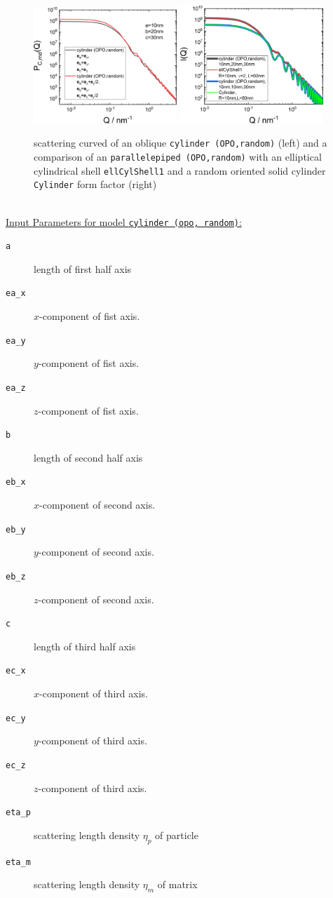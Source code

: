 \begin{figure}[htb]
\includegraphics[width=0.481\textwidth]{../images/form_factor/oriented_primitive_opbjects/cylinderOPOoblique.png} \hfill
\includegraphics[width=0.481\textwidth]{../images/form_factor/oriented_primitive_opbjects/cylinderOPOcompare.png}
\caption{scattering curved of an oblique \texttt{cylinder (OPO,random)} (left) and a comparison of an \texttt{parallelepiped (OPO,random)} with an elliptical cylindrical shell \texttt{ellCylShell1} and a random oriented solid cylinder  \texttt{Cylinder} form factor (right)}
\label{fig:opo_ellipsoidIQrandom}
\end{figure}

~\\
\uline{Input Parameters for model \texttt{cylinder (opo, random)}:}
\begin{description}
\item[\texttt{a}] length of first half axis
\item[\texttt{ea\_x}] $x$-component of fist axis.
\item[\texttt{ea\_y}] $y$-component of fist axis.
\item[\texttt{ea\_z}] $z$-component of fist axis.
\item[\texttt{b}] length of second half axis
\item[\texttt{eb\_x}] $x$-component of second axis.
\item[\texttt{eb\_y}] $y$-component of second axis.
\item[\texttt{eb\_z}] $z$-component of second axis.
\item[\texttt{c}] length of third half axis
\item[\texttt{ec\_x}] $x$-component of third axis.
\item[\texttt{ec\_y}] $y$-component of third axis.
\item[\texttt{ec\_z}] $z$-component of third axis.
\item[\texttt{eta\_p}] scattering length density $\eta_p$ of particle
\item[\texttt{eta\_m}] scattering length density $\eta_m$ of matrix
\end{description}

